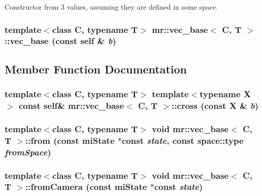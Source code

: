 Constructor from 3 values, assuming they are defined in some space. 

\subsubsection{\setlength{\rightskip}{0pt plus 5cm}template$<$class C, typename T$>$ {\bf mr::vec\_\-base}$<$ C, T $>$::{\bf vec\_\-base} (const {\bf self} \& {\em b})\hspace{0.3cm}{\tt  [inline]}}\label{structmr_1_1vec__base_z59_0}




\subsection{Member Function Documentation}
\subsubsection{\setlength{\rightskip}{0pt plus 5cm}template$<$class C, typename T$>$ template$<$typename X$>$ const {\bf self}\& {\bf mr::vec\_\-base}$<$ C, T $>$::cross (const X \& {\em b})\hspace{0.3cm}{\tt  [inline]}}\label{structmr_1_1vec__base_z62_2}


\subsubsection{\setlength{\rightskip}{0pt plus 5cm}template$<$class C, typename T$>$ void {\bf mr::vec\_\-base}$<$ C, T $>$::from (const mi\-State $\ast$const {\em state}, const {\bf space::type} {\em from\-Space})\hspace{0.3cm}{\tt  [inline]}}\label{structmr_1_1vec__base_a14}


\subsubsection{\setlength{\rightskip}{0pt plus 5cm}template$<$class C, typename T$>$ void {\bf mr::vec\_\-base}$<$ C, T $>$::from\-Camera (const mi\-State $\ast$const {\em state})\hspace{0.3cm}{\tt  [inline]}}\label{structmr_1_1vec__base_a10}


